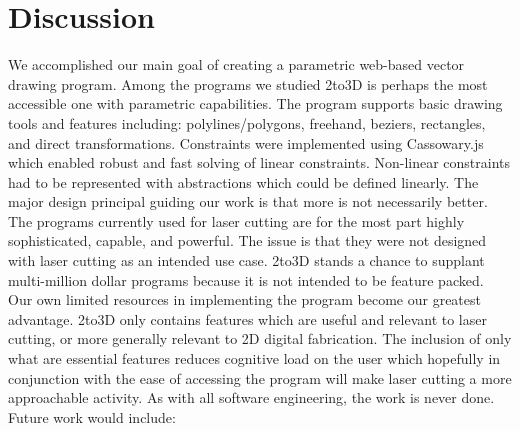 \section{Discussion}

We accomplished our main goal of creating a parametric web-based vector drawing program. Among the programs we studied 2to3D is perhaps the most accessible one with parametric capabilities. The program supports basic drawing tools and features including: polylines/polygons, freehand, beziers, rectangles, and direct transformations. Constraints were implemented using Cassowary.js which enabled robust and fast solving of linear constraints. Non-linear constraints had to be represented with abstractions which could be defined linearly. The major design principal guiding our work is that more is not necessarily better. The programs currently used for laser cutting are for the most part highly sophisticated, capable, and powerful. The issue is that they were not designed with laser cutting as an intended use case. 2to3D stands a chance to supplant multi-million dollar programs because it is not intended to be feature packed. Our own limited resources in implementing the program become our greatest advantage. 2to3D only contains features which are useful and relevant to laser cutting, or more generally relevant to 2D digital fabrication. The inclusion of only what are essential features reduces cognitive load on the user which hopefully in conjunction with the ease of accessing the program will make laser cutting a more approachable activity. As with all software engineering, the work is never done. Future work would include:


